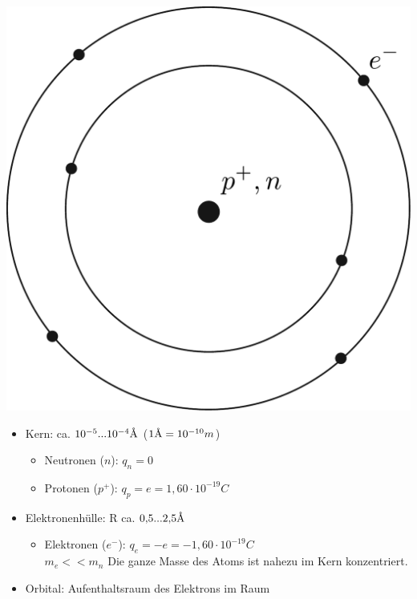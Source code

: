 \begin{minipage}{.3\textwidth}
	\includegraphics[width=\textwidth]{img/1_1}
\end{minipage}\hfill
\begin{minipage}{.65\textwidth}
	\begin{itemize}
		\item Kern: ca. $10^{-5}...10^{-4} \mbox{\normalfont\AA}$ ($1\mbox{\normalfont\AA} = 10^{-10}m$)
		\begin{itemize}
			\item Neutronen ($n$): $q_n = 0$
			\item Protonen ($p^+$): $q_p = e = 1{,}60 \cdot 10^{-19}C$
		\end{itemize}
		\item Elektronenhülle: R ca. $0{,}5...2{,}5\mbox{\normalfont\AA}$
		\begin{itemize}
			\item Elektronen ($e^-$): $q_e = -e = -1{,}60 \cdot 10^{-19}C$ \\ 
			$m_e << m_n$ \Ra Die ganze Masse des Atoms ist nahezu im Kern konzentriert.
		\end{itemize}
		\item Orbital: Aufenthaltsraum des Elektrons im Raum
	\end{itemize}
\end{minipage}

